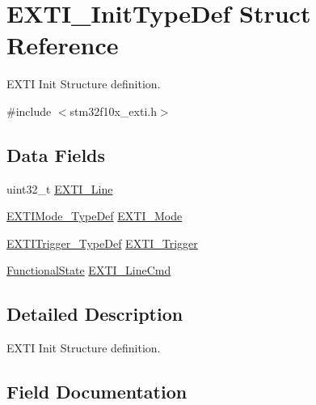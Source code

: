 \hypertarget{struct_e_x_t_i___init_type_def}{}\section{E\+X\+T\+I\+\_\+\+Init\+Type\+Def Struct Reference}
\label{struct_e_x_t_i___init_type_def}


E\+X\+TI Init Structure definition.  




{\ttfamily \#include $<$stm32f10x\+\_\+exti.\+h$>$}

\subsection*{Data Fields}
\begin{DoxyCompactItemize}
\item 
uint32\+\_\+t \mbox{\hyperlink{struct_e_x_t_i___init_type_def_aef528a7c9a2804cc7672755c91e5b0e1}{E\+X\+T\+I\+\_\+\+Line}}
\item 
\mbox{\hyperlink{group___e_x_t_i___exported___types_gad5e69af98dc0dfdf64417adc1cf57929}{E\+X\+T\+I\+Mode\+\_\+\+Type\+Def}} \mbox{\hyperlink{struct_e_x_t_i___init_type_def_abea50256cdb09a2a84fc8f104611b867}{E\+X\+T\+I\+\_\+\+Mode}}
\item 
\mbox{\hyperlink{group___e_x_t_i___exported___types_ga9da190f5425d1b421a06bced8cc48e9b}{E\+X\+T\+I\+Trigger\+\_\+\+Type\+Def}} \mbox{\hyperlink{struct_e_x_t_i___init_type_def_ab60cf7701e280ca910eff8c618590ec5}{E\+X\+T\+I\+\_\+\+Trigger}}
\item 
\mbox{\hyperlink{group___exported__types_gac9a7e9a35d2513ec15c3b537aaa4fba1}{Functional\+State}} \mbox{\hyperlink{struct_e_x_t_i___init_type_def_a5a4f12d56819fcfdd25f973adbbca045}{E\+X\+T\+I\+\_\+\+Line\+Cmd}}
\end{DoxyCompactItemize}


\subsection{Detailed Description}
E\+X\+TI Init Structure definition. 



\subsection{Field Documentation}
\mbox{\label{struct_e_x_t_i___init_type_def_aef528a7c9a2804cc7672755c91e5b0e1}} 
